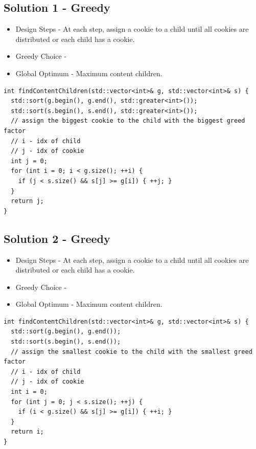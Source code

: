 \subsection*{Solution 1 - Greedy}
\begin{itemize}
	\item Design Steps - At each step, assign a cookie to a child until all cookies are distributed or each child has a cookie.
	\item Greedy Choice - {\color{magenta}{At each step, try to use the largest cookies left to satisfy the child with the biggest greedy factor.}}
	\item Global Optimum - Maximum content children.
\end{itemize}
\begin{lstlisting}
int findContentChildren(std::vector<int>& g, std::vector<int>& s) {
  std::sort(g.begin(), g.end(), std::greater<int>());
  std::sort(s.begin(), s.end(), std::greater<int>());
  // assign the biggest cookie to the child with the biggest greed factor
  // i - idx of child
  // j - idx of cookie
  int j = 0;
  for (int i = 0; i < g.size(); ++i) {
    if (j < s.size() && s[j] >= g[i]) { ++j; }
  }
  return j;
}
\end{lstlisting}

\subsection*{Solution 2 - Greedy}
\begin{itemize}
	\item Design Steps - At each step, assign a cookie to a child until all cookies are distributed or each child has a cookie.
	\item Greedy Choice - {\color{magenta}{At each step, try to use the smallest cookies left to satisfy the child with the smallest greedy factor.}}
	\item Global Optimum - Maximum content children.
\end{itemize}
\begin{lstlisting}
int findContentChildren(std::vector<int>& g, std::vector<int>& s) {
  std::sort(g.begin(), g.end());
  std::sort(s.begin(), s.end());
  // assign the smallest cookie to the child with the smallest greed factor
  // i - idx of child
  // j - idx of cookie
  int i = 0;
  for (int j = 0; j < s.size(); ++j) {
    if (i < g.size() && s[j] >= g[i]) { ++i; }
  }
  return i;
}
\end{lstlisting}

